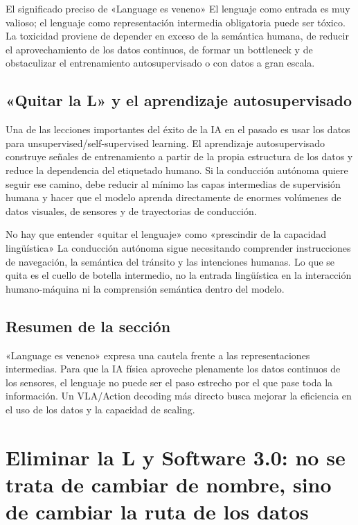 \documentclass[a4paper]{article}
\begin{document}
\begin{importantbox}{El significado preciso de «Language es veneno»}
El lenguaje como entrada es muy valioso; el lenguaje como representación intermedia obligatoria puede ser tóxico. La toxicidad proviene de depender en exceso de la semántica humana, de reducir el aprovechamiento de los datos continuos, de formar un bottleneck y de obstaculizar el entrenamiento autosupervisado o con datos a gran escala.
\end{importantbox}

\subsection{«Quitar la L» y el aprendizaje autosupervisado}

Una de las lecciones importantes del éxito de la IA en el pasado es usar los datos para unsupervised/self-supervised learning. El aprendizaje autosupervisado construye señales de entrenamiento a partir de la propia estructura de los datos y reduce la dependencia del etiquetado humano. Si la conducción autónoma quiere seguir ese camino, debe reducir al mínimo las capas intermedias de supervisión humana y hacer que el modelo aprenda directamente de enormes volúmenes de datos visuales, de sensores y de trayectorias de conducción.

\begin{warningbox}{No hay que entender «quitar el lenguaje» como «prescindir de la capacidad lingüística»}
La conducción autónoma sigue necesitando comprender instrucciones de navegación, la semántica del tránsito y las intenciones humanas. Lo que se quita es el cuello de botella intermedio, no la entrada lingüística en la interacción humano-máquina ni la comprensión semántica dentro del modelo.
\end{warningbox}

\subsection{Resumen de la sección}

«Language es veneno» expresa una cautela frente a las representaciones intermedias. Para que la IA física aproveche plenamente los datos continuos de los sensores, el lenguaje no puede ser el paso estrecho por el que pase toda la información. Un VLA/Action decoding más directo busca mejorar la eficiencia en el uso de los datos y la capacidad de scaling.
\section{Eliminar la L y Software 3.0: no se trata de cambiar de nombre, sino de cambiar la ruta de los datos}
\end{document}
